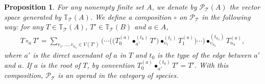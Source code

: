 \documentclass[10pt,a4paper]{amsart}
\numberwithin{equation}{section}
\newtheorem{Proposition}[Theorem]{Proposition}
 { \theoremstyle{definition}
\newtheorem{Definition}[Theorem]{Definition}
\newtheorem{Note}[Theorem]{Note}
\newtheorem{Example}[Theorem]{Example}
\newtheorem{Remark}[Theorem]{Remark}
\newtheorem{Notation}[Theorem]{Notation}}
\newcommand{\T}{\mathcal{T}}
\newcommand{\bfT}{\mathbb{T}}
\renewcommand{\P}{\mathcal{P}}
\begin{document}
\begin{Proposition}
For any nonempty finite set $A$, we denote by $\P_\T(A)$ the vector space gene\-ra\-ted by $\bfT_\T(A)$.
We define a composition $\circ$ on $\P_\T$ in the following way: for any $T\in \bfT_\T(A)$,
$T'\in \bfT_\T(B)$ and $a\in A$,
\begin{gather*}
T\circ_a T'=\sum_{v_1,\dots,v_{n_a}\in V(T')}
\big(\cdots\big (\big(T_0^{(a)}\bullet_{a'}^{(t_0)} T'\big)\bullet_{v_1}^{(t_1)} T_1^{(a)}\big)\cdots\big)
\bullet_{v_{n_a}}^{(t_{n_a})} T_{n_a}^{(a)},\end{gather*}
where $a'$ is the direct ascendant of $a$ in $T$ and $t_0$ is the type of the edge between $a'$ and $a$.
If $a$ is the root of $T$, by convention $T_0^{(a)}\bullet_{a'}^{(t_0)} T'=T'$.
With this composition, $\P_\T$ is an operad in the category of species.
\end{Proposition}
\end{document}
